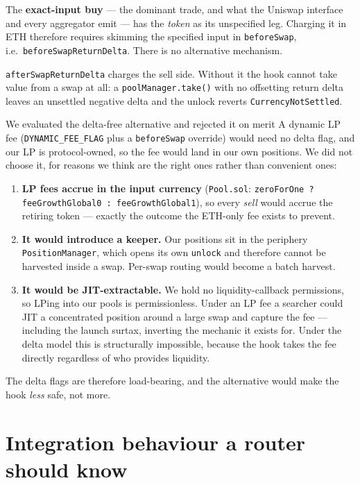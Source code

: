 \documentclass[11pt,a4paper]{article}
\newcommand{\code}[1]{\texttt{\small #1}}
\begin{document}
The \textbf{exact-input buy} --- the dominant trade, and what the Uniswap
interface and every aggregator emit --- has the \emph{token} as its unspecified
leg. Charging it in ETH therefore requires skimming the specified input in
\code{beforeSwap}, i.e.\ \code{beforeSwapReturnDelta}. There is no alternative
mechanism.

\code{afterSwapReturnDelta} charges the sell side. Without it the hook cannot
take value from a swap at all: a \code{poolManager.take()} with no offsetting
return delta leaves an unsettled negative delta and the unlock reverts
\code{CurrencyNotSettled}.

\begin{plainbox}{We evaluated the delta-free alternative and rejected it on merit}
A dynamic LP fee (\code{DYNAMIC\_FEE\_FLAG} plus a \code{beforeSwap} override)
would need no delta flag, and our LP is protocol-owned, so the fee would land in
our own positions. We did not choose it, for reasons we think are the right ones
rather than convenient ones:

\begin{enumerate}[leftmargin=1.6em]
\item \textbf{LP fees accrue in the input currency}
(\code{Pool.sol}: \code{zeroForOne ? feeGrowthGlobal0 : feeGrowthGlobal1}), so
every \emph{sell} would accrue the retiring token --- exactly the outcome the
ETH-only fee exists to prevent.
\item \textbf{It would introduce a keeper.} Our positions sit in the periphery
\code{PositionManager}, which opens its own \code{unlock} and therefore cannot be
harvested inside a swap. Per-swap routing would become a batch harvest.
\item \textbf{It would be JIT-extractable.} We hold no liquidity-callback
permissions, so LPing into our pools is permissionless. Under an LP fee a
searcher could JIT a concentrated position around a large swap and capture the
fee --- including the launch surtax, inverting the mechanic it exists for. Under
the delta model this is structurally impossible, because the hook takes the fee
directly regardless of who provides liquidity.
\end{enumerate}
The delta flags are therefore load-bearing, and the alternative would make the
hook \emph{less} safe, not more.
\end{plainbox}

\section{Integration behaviour a router should know}
\label{sec:integration}
\end{document}
